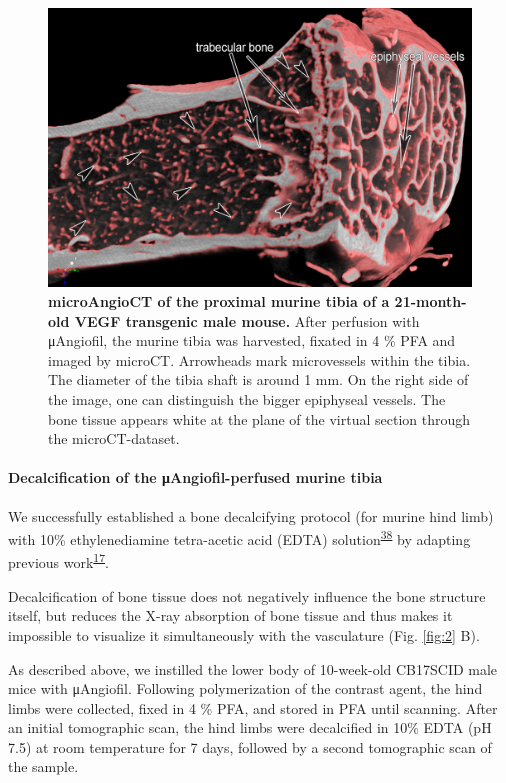 \begin{figure}
\hypertarget{fig:1}{%
\centering
\includegraphics{images/Fig1_murine_tibia.png}
\caption{\textbf{microAngioCT of the proximal murine tibia of a 21-month-old VEGF transgenic male mouse.}
After perfusion with μAngiofil, the murine tibia was harvested, fixated in 4 \% PFA and imaged by microCT.
Arrowheads mark microvessels within the tibia.
The diameter of the tibia shaft is around 1 mm.
On the right side of the image, one can distinguish the bigger epiphyseal vessels.
The bone tissue appears white at the plane of the virtual section through the microCT-dataset.}\label{fig:1}
}
\end{figure}

\hypertarget{decalcification-of-the-ux3bcangiofil-perfused-murine-tibia}{%
\paragraph{Decalcification of the μAngiofil-perfused murine tibia}\label{decalcification-of-the-ux3bcangiofil-perfused-murine-tibia}}

We successfully established a bone decalcifying protocol (for murine hind limb) with 10\% ethylenediamine tetra-acetic acid (EDTA) solution\textsuperscript{\protect\hyperlink{ref-iM9i6gkJ}{38}} by adapting previous work\textsuperscript{\protect\hyperlink{ref-168Ee16HU}{17}}.

Decalcification of bone tissue does not negatively influence the bone structure itself, but reduces the X-ray absorption of bone tissue and thus makes it impossible to visualize it simultaneously with the vasculature (Fig. \ref{fig:2} B).

As described above, we instilled the lower body of 10-week-old CB17SCID male mice with μAngiofil.
Following polymerization of the contrast agent, the hind limbs were collected, fixed in 4 \% PFA, and stored in PFA until scanning.
After an initial tomographic scan, the hind limbs were decalcified in 10\% EDTA (pH 7.5) at room temperature for 7 days, followed by a second tomographic scan of the sample.

